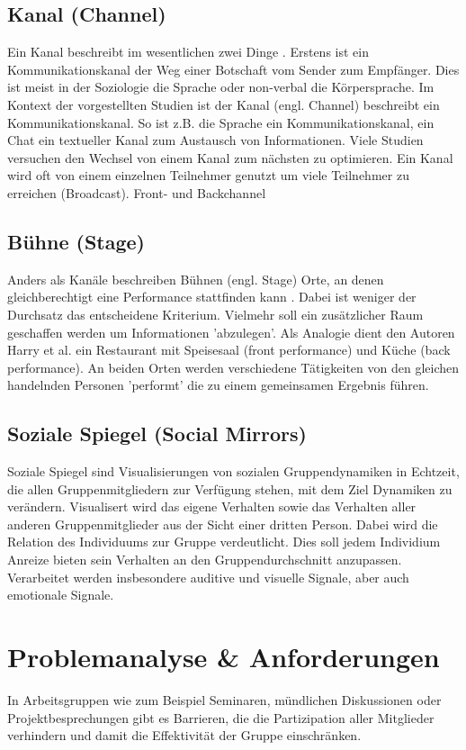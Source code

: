 \documentclass{seminarvorlage}
\begin{document}
\subsection{Kanal (Channel)}
Ein Kanal beschreibt im wesentlichen zwei Dinge \cite{BergKara2009-1}. Erstens
ist ein Kommunikationskanal der Weg einer Botschaft vom Sender zum Empfänger.
Dies ist meist in der Soziologie die Sprache oder non-verbal die Körpersprache.
Im Kontext der vorgestellten Studien ist der Kanal (engl. Channel) beschreibt
ein Kommunikationskanal. So ist z.B. die Sprache ein Kommunikationskanal, ein
Chat ein textueller Kanal zum Austausch von Informationen. Viele Studien
versuchen den Wechsel von einem Kanal zum nächsten zu optimieren. Ein Kanal wird
oft von einem einzelnen Teilnehmer genutzt um viele Teilnehmer zu erreichen
(Broadcast). Front- und Backchannel

\subsection{Bühne (Stage)}
Anders als Kanäle beschreiben Bühnen (engl. Stage) Orte, an denen
gleichberechtigt eine Performance stattfinden kann \cite{Goff1959}. Dabei ist
weniger der Durchsatz das entscheidene Kriterium. Vielmehr soll ein zusätzlicher
Raum geschaffen werden um Informationen 'abzulegen'. Als Analogie dient den
Autoren Harry et al. ein Restaurant mit Speisesaal (front performance) und Küche
(back performance).
An beiden Orten werden verschiedene Tätigkeiten von den gleichen handelnden
Personen 'performt' die zu einem gemeinsamen Ergebnis führen.

\subsection{Soziale Spiegel (Social Mirrors)}
Soziale Spiegel \cite{BergKara2009-2} sind Visualisierungen von sozialen
Gruppendynamiken in Echtzeit, die allen Gruppenmitgliedern zur Verfügung stehen,
mit dem Ziel Dynamiken zu verändern. Visualisert wird das eigene Verhalten sowie
das Verhalten aller anderen Gruppenmitglieder aus der Sicht einer dritten
Person. Dabei wird die Relation des Individuums zur Gruppe verdeutlicht. Dies
soll jedem Individium Anreize bieten sein Verhalten an den Gruppendurchschnitt
anzupassen. Verarbeitet werden insbesondere auditive und visuelle Signale, aber
auch emotionale Signale.

\section{Problemanalyse \& Anforderungen}
In Arbeitsgruppen wie zum Beispiel Seminaren, mündlichen Diskussionen oder
Projektbesprechungen gibt es Barrieren, die die Partizipation aller
Mitglieder verhindern und damit die Effektivität der Gruppe einschränken.
\end{document}
